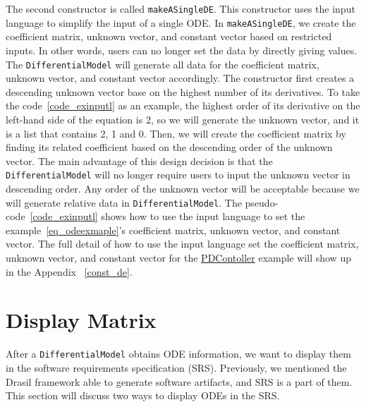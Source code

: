 The second constructor is called \verb|makeASingleDE|. This constructor uses the input language to simplify the input of a single ODE. In \verb|makeASingleDE|, we create the coefficient matrix, unknown vector, and constant vector based on restricted inputs. In other words, users can no longer set the data by directly giving values. The \verb|DifferentialModel| will generate all data for the coefficient matrix, unknown vector, and constant vector accordingly. The constructor first creates a descending unknown vector base on the highest number of its derivatives. To take the code~\ref{code_exinputl} as an example, the highest order of its derivative on the left-hand side of the equation is 2, so we will generate the unknown vector, and it is a list that contains 2, 1 and 0. Then, we will create the coefficient matrix by finding its related coefficient based on the descending order of the unknown vector. The main advantage of this design decision is that the \verb|DifferentialModel| will no longer require users to input the unknown vector in descending order. Any order of the unknown vector will be acceptable because we will generate relative data in \verb|DifferentialModel|. The pseudo-code~\ref{code_exinputl} shows how to use the input language to set the example~\ref{eq_odeexmaple}'s coefficient matrix, unknown vector, and constant vector. The full detail of how to use the input language set the coefficient matrix, unknown vector, and constant vector for the \href{https://jacquescarette.github.io/Drasil/examples/pdcontroller/SRS/srs/PDController_SRS.html}{PDContoller} example will show up in the Appendix ~\ref{const_de}.

\section{Display Matrix}
After a \verb|DifferentialModel| obtains ODE information, we want to display them in the software requirements specification (SRS). Previously, we mentioned the Drasil framework able to generate software artifacts, and SRS is a part of them. This section will discuss two ways to display ODEs in the SRS.


